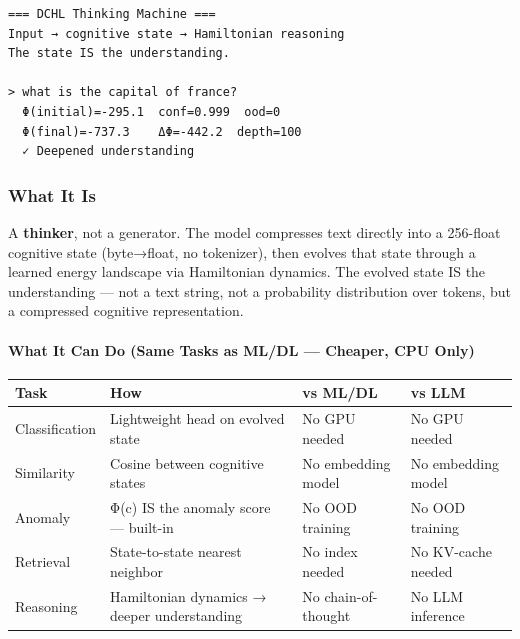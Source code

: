 \documentclass[
  11pt,
  a4paper,
]{article}
\begin{document}
\begin{verbatim}
=== DCHL Thinking Machine ===
Input → cognitive state → Hamiltonian reasoning
The state IS the understanding.

> what is the capital of france?
  Φ(initial)=-295.1  conf=0.999  ood=0
  Φ(final)=-737.3    ΔΦ=-442.2  depth=100
  ✓ Deepened understanding
\end{verbatim}

\subsubsection{What It Is}\label{what-it-is}

A \textbf{thinker}, not a generator. The model compresses text directly
into a 256-float cognitive state (byte→float, no tokenizer), then
evolves that state through a learned energy landscape via Hamiltonian
dynamics. The evolved state IS the understanding --- not a text string,
not a probability distribution over tokens, but a compressed cognitive
representation.

\paragraph{What It Can Do (Same Tasks as ML/DL --- Cheaper, CPU
Only)}\label{what-it-can-do-same-tasks-as-mldl-cheaper-cpu-only}

\begin{longtable}[]{@{}
  >{\raggedright\arraybackslash}p{}
  >{\raggedright\arraybackslash}p{}
  >{\raggedright\arraybackslash}p{}
  >{\raggedright\arraybackslash}p{}@{}}
\toprule\noalign{}
\begin{minipage}[b]{\linewidth}\raggedright
Task
\end{minipage} & \begin{minipage}[b]{\linewidth}\raggedright
How
\end{minipage} & \begin{minipage}[b]{\linewidth}\raggedright
vs ML/DL
\end{minipage} & \begin{minipage}[b]{\linewidth}\raggedright
vs LLM
\end{minipage} \\
\midrule\noalign{}
\endhead
\bottomrule\noalign{}
\endlastfoot
Classification & Lightweight head on evolved state & No GPU needed & No
GPU needed \\
Similarity & Cosine between cognitive states & No embedding model & No
embedding model \\
Anomaly & Φ(c) IS the anomaly score --- built-in & No OOD training & No
OOD training \\
Retrieval & State-to-state nearest neighbor & No index needed & No
KV-cache needed \\
Reasoning & Hamiltonian dynamics → deeper understanding & No
chain-of-thought & No LLM inference \\
\end{longtable}
\end{document}
